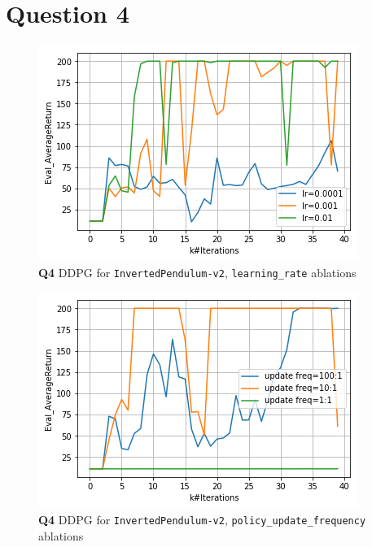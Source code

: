 \documentclass[11pt]{article}
\begin{document}
\clearpage


\section{Question 4}
\label{sec:org40ff35e}

\begin{figure}[htbp]
\centering
\includegraphics[width=.9\linewidth]{./41.png}
\caption{\textbf{Q4}  DDPG for \texttt{InvertedPendulum-v2}, \texttt{learning\_rate} ablations}
\end{figure}


\begin{figure}[htbp]
\centering
\includegraphics[width=.9\linewidth]{./42.png}
\caption{\textbf{Q4}  DDPG for \texttt{InvertedPendulum-v2}, \texttt{policy\_update\_frequency} ablations}
\end{figure}
\end{document}
